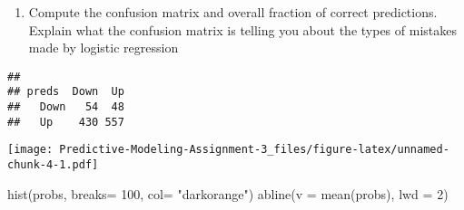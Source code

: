 \documentclass[
]{article}
\newenvironment{Shaded}{\begin{snugshade}}{\end{snugshade}}
\newcommand{\AttributeTok}[1]{\textcolor[rgb]{0.77,0.63,0.00}{#1}}
\newcommand{\DecValTok}[1]{\textcolor[rgb]{0.00,0.00,0.81}{#1}}
\newcommand{\FloatTok}[1]{\textcolor[rgb]{0.00,0.00,0.81}{#1}}
\newcommand{\FunctionTok}[1]{\textcolor[rgb]{0.00,0.00,0.00}{#1}}
\newcommand{\NormalTok}[1]{#1}
\newcommand{\OtherTok}[1]{\textcolor[rgb]{0.56,0.35,0.01}{#1}}
\newcommand{\SpecialCharTok}[1]{\textcolor[rgb]{0.00,0.00,0.00}{#1}}
\newcommand{\StringTok}[1]{\textcolor[rgb]{0.31,0.60,0.02}{#1}}
\providecommand{\tightlist}{%
  \setlength{\itemsep}{0pt}\setlength{\parskip}{0pt}}
\begin{document}
\begin{enumerate}
\def\labelenumi{(\alph{enumi})}
\setcounter{enumi}{2}
\tightlist
\item
  Compute the confusion matrix and overall fraction of correct
  predictions. Explain what the confusion matrix is telling you about
  the types of mistakes made by logistic regression
\end{enumerate}

\begin{Shaded}
\end{Shaded}

\begin{verbatim}
##       
## preds  Down  Up
##   Down   54  48
##   Up    430 557
\end{verbatim}

\begin{Shaded}
\end{Shaded}

\texttt{[image: Predictive-Modeling-Assignment-3\_files/figure-latex/unnamed-chunk-4-1.pdf]}

\begin{Shaded}
\begin{Highlighting}[]
\FunctionTok{hist}\NormalTok{(probs, }\AttributeTok{breaks=} \DecValTok{100}\NormalTok{, }\AttributeTok{col=} \StringTok{"darkorange"}\NormalTok{)}
\FunctionTok{abline}\NormalTok{(}\AttributeTok{v =} \FunctionTok{mean}\NormalTok{(probs), }\AttributeTok{lwd =} \DecValTok{2}\NormalTok{)}
\end{Highlighting}
\end{Shaded}
\end{document}
